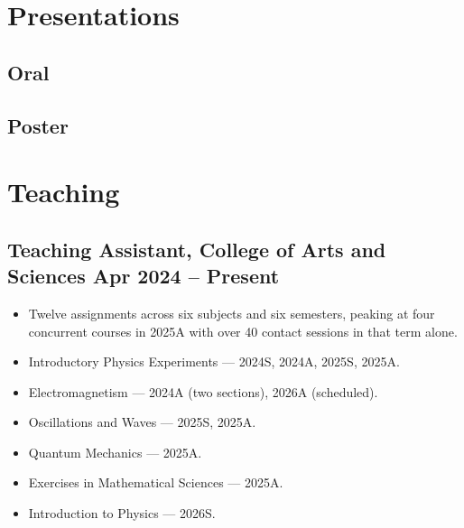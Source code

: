 \documentclass[11pt]{article}
\begin{document}
\section{Presentations}
\subsection{Oral}
\begin{enumerate}[resume=cvrefs, label={[\arabic*]}]
	\item {}
	\item {}
\end{enumerate}

\subsection{Poster}
\begin{enumerate}[resume=cvrefs, label={[\arabic*]}]
	\item {}
	\item {}
\end{enumerate}

\section{Teaching}
\subsection{Teaching Assistant, College of Arts and Sciences \hfill Apr 2024 -- Present}
\begin{itemize}
	\item Twelve assignments across six subjects and six semesters, peaking at four concurrent courses in 2025A with over 40 contact sessions in that term alone.
	\item Introductory Physics Experiments --- 2024S, 2024A, 2025S, 2025A.
	\item Electromagnetism --- 2024A (two sections), 2026A (scheduled).
	\item Oscillations and Waves --- 2025S, 2025A.
	\item Quantum Mechanics --- 2025A.
	\item Exercises in Mathematical Sciences --- 2025A.
	\item Introduction to Physics --- 2026S.
\end{itemize}
\end{document}
